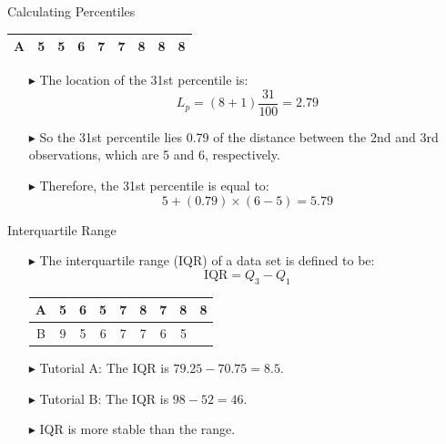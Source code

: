 \documentclass[12pt]{beamer}
\begin{document}
\begin{frame}{Calculating Percentiles}
	\begin{center}
		\begin{tabular}{ccccccccc}
			\hline\hline
			A & 5 & 5 & 6 & 7 & 7 & 8 & 8 & 8\\
			\hline\hline
		\end{tabular}
	\end{center}
	\begin{itemize}
		\item[$\blacktriangleright$] The location of the 31st percentile is:
		$$L_p=(8+1)\frac{31}{100}=2.79$$
		\item[$\blacktriangleright$] So the 31st percentile lies 0.79 of the distance between the 2nd and 3rd observations, which are 5 and 6, respectively.
		\item[$\blacktriangleright$] Therefore, the 31st percentile is equal to:
		$$5+(0.79)\times(6-5)=5.79$$
	\end{itemize}
\end{frame}
\begin{frame}{Interquartile Range}
	\begin{itemize}
		\item[$\blacktriangleright$] The interquartile range (IQR) of a data set is defined to be:
		$$\text{IQR}=Q_3-Q_1$$
			\begin{center}
			\begin{tabular}{ccccccccc}
				\hline\hline
				A & 5 & 6 & 5 & 7 & 8 & 7 & 8 & 8\\
				\hline
				B & 9 & 5 & 6 & 7 & 7 & 6 & 5 & \\
				\hline
			\end{tabular}
		\end{center}
		\vspace{0.5cm}
		
		\item[$\blacktriangleright$] Tutorial A: The IQR is $79.25-70.75 = 8.5$.
		\item[$\blacktriangleright$] Tutorial B: The IQR is $98-52 = 46$.
		\item[$\blacktriangleright$] IQR is more stable than the range.
	\end{itemize}
\end{frame}
\end{document}
